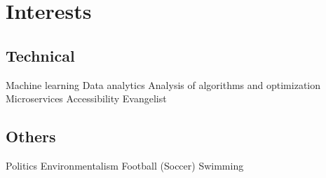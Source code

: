 \documentclass[]{deedy-resume-openfont}
\begin{document}
\begin{minipage}[t]{0.33\textwidth}


\section{Interests}
\subsection{Technical}
Machine learning \textbullet{} Data analytics \textbullet{} Analysis of algorithms and optimization \textbullet{} Microservices
\textbullet{} Accessibility Evangelist 

\vspace{\topsep}
\subsection{Others}
Politics \textbullet{} Environmentalism \textbullet{} Football (Soccer) \textbullet{} Swimming
\sectionsep



%
%

\end{minipage} 
\hfill
\end{document}
